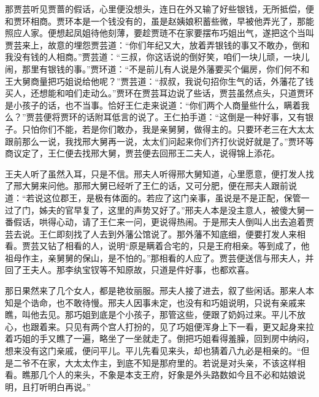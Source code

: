 \begin{parag}
    那贾芸听见贾蔷的假话，心里便没想头，连日在外又输了好些银钱，无所抵偿，便和贾环相商。贾环本是一个钱没有的，虽是赵姨娘积蓄些微，早被他弄光了，那能照应人家。便想起凤姐待他刻薄，要趁贾琏不在家要摆布巧姐出气，遂把这个当叫贾芸来上，故意的埋怨贾芸道：“你们年纪又大，放着弄银钱的事又不敢办，倒和我没有钱的人相商。”贾芸道：“三叔，你这话说的倒好笑，咱们一块儿顽，一块儿闹，那里有银钱的事。”贾环道：“不是前儿有人说是外藩要买个偏房，你们何不和王大舅商量把巧姐说给他呢？”贾芸道：“叔叔，我说句招你生气的话，外藩花了钱买人，还想能和咱们走动么。”贾环在贾芸耳边说了些话，贾芸虽然点头，只道贾环是小孩子的话，也不当事。恰好王仁走来说道：“你们两个人商量些什么，瞒着我么？”贾芸便将贾环的话附耳低言的说了。王仁拍手道：“这倒是一种好事，又有银子。只怕你们不能，若是你们敢办，我是亲舅舅，做得主的。只要环老三在大太太跟前那么一说，我找邢大舅再一说，太太们问起来你们齐打伙说好就是了。”贾环等商议定了，王仁便去找邢大舅，贾芸便去回邢王二夫人，说得锦上添花。
\end{parag}


\begin{parag}
    王夫人听了虽然入耳，只是不信。邢夫人听得邢大舅知道，心里愿意，便打发人找了邢大舅来问他。那邢大舅已经听了王仁的话，又可分肥，便在邢夫人跟前说道：“若说这位郡王，是极有体面的。若应了这门亲事，虽说是不是正配，保管一过了门，姊夫的官早复了，这里的声势又好了。”邢夫人本是没主意人，被傻大舅一番假话，哄得心动，请了王仁来一问，更说得热闹。于是邢夫人倒叫人出去追着贾芸去说。王仁即刻找了人去到外藩公馆说了。那外藩不知底细，便要打发人来相看。贾芸又钻了相看的人，说明“原是瞒着合宅的，只是王府相亲。等到成了，他祖母作主，亲舅舅的保山，是不怕的。”那相看的人应了。贾芸便送信与邢夫人，并回了王夫人。那李纨宝钗等不知原故，只道是件好事，也都欢喜。
\end{parag}


\begin{parag}
    那日果然来了几个女人，都是艳妆丽服。邢夫人接了进去，叙了些闲话。那来人本知是个诰命，也不敢待慢。邢夫人因事未定，也没有和巧姐说明，只说有亲戚来瞧，叫他去见。那巧姐到底是个小孩子，那管这些，便跟了奶妈过来。平儿不放心，也跟着来。只见有两个宫人打扮的，见了巧姐便浑身上下一看，更又起身来拉着巧姐的手又瞧了一遍，略坐了一坐就走了。倒把巧姐看得羞臊，回到房中纳闷，想来没有这门亲戚，便问平儿。平儿先看见来头，却也猜着八九必是相亲的。“但是二爷不在家，大太太作主，到底不知是那府里的。若说是对头亲，不该这样相看。瞧那几个人的来头，不象是本支王府，好象是外头路数如今且不必和姑娘说明，且打听明白再说。”
\end{parag}



